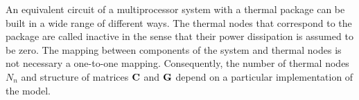 An equivalent circuit of a multiprocessor system with a thermal package can be built in a wide range of different ways. The thermal nodes that correspond to the package are called inactive in the sense that their power dissipation is assumed to be zero. The mapping between components of the system and thermal nodes is not necessary a one-to-one mapping. Consequently, the number of thermal nodes $N_n$ and structure of matrices $\mathbf{C}$ and $\mathbf{G}$ depend on a particular implementation of the model.

